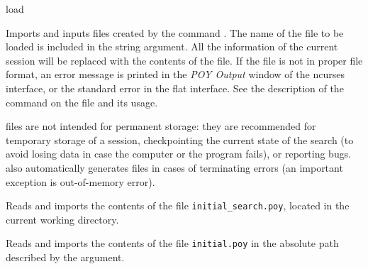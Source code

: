 \begin{command}{load}{}

	\syntax{\obligatory{(\poystring)}} 

	\begin{poydescription}
             Imports and inputs \poy files created by the command
             .  The name of the file to be loaded
              is included in the string argument. All the information of
               the current \poy session will be replaced with the contents
              of the \poy file. If the file is not in proper \poy file
            format, an error message is printed in the \emph{POY Output}
            window of the ncurses interface, or the standard error in the flat interface.
            See the description of the command  on the \poy file
            and its usage.

            \poy files are not intended for permanent storage: they are recommended
        for temporary storage of a \poy session, checkpointing
        the current state of the search (to avoid losing data in case the computer or the
        program fails), or reporting bugs. \poy also automatically
        generates \poy files in cases of terminating errors (an important exception is
        out-of-memory error).
	
	\end{poydescription}

    \begin{poyexamples}
            {Reads and imports the contents of the \poy file
            \texttt{initial\_search.poy}, located in the current working
            directory.}

            {Reads and imports the contents of the \poy file \texttt{initial.poy}
             in the absolute path described by the argument.}
    \end{poyexamples}

    \begin{poyalso}
    \end{poyalso}

\end{command}

